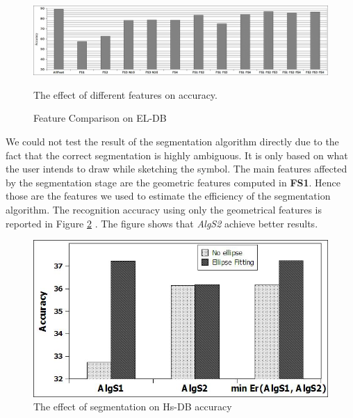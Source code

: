 \documentclass{article}
\begin{document}
 \begin{figure}
	\centering
		\includegraphics[scale=0.34]{images/featELc.jpg}
	\caption{Feature Comparison on EL-DB} The effect of different features on accuracy.  %
	\label{fig:ELtestFeaturesAll}
\end{figure}  
 We could not test the result of the segmentation algorithm directly due to the fact that the correct segmentation is highly ambiguous. It is only based on what the user intends to draw while sketching the symbol. 
 The main features affected by the segmentation stage are the geometric features computed in \textbf{FS1}. Hence those are the features we used to estimate the efficiency of the segmentation algorithm. The recognition accuracy using only the geometrical features is reported in Figure \ref{fig:testFeatonly} . The figure shows that \textsl{AlgS2} achieve better results.  %
\begin{figure}
	\centering
		\includegraphics[scale=0.4]{images/featureFS1only.jpg}
	\caption{The effect of segmentation on Hs-DB accuracy} %
	\label{fig:testFeatonly}
\end{figure}  
\end{document}

